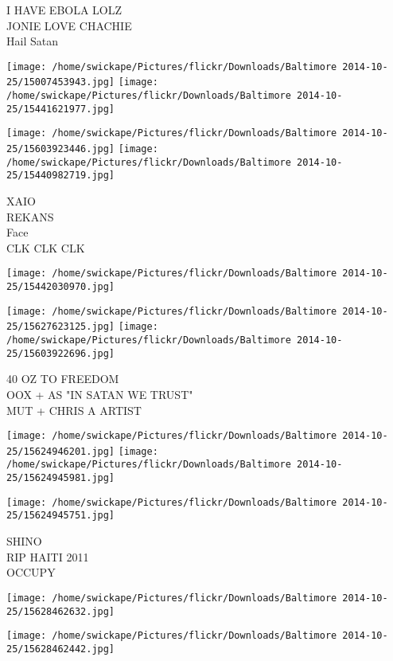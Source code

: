 \documentclass[10pt,letterpaper]{article}
\begin{document}
I HAVE EBOLA LOLZ\\
JONIE LOVE CHACHIE\\
Hail Satan
\pagebreak

\texttt{[image: /home/swickape/Pictures/flickr/Downloads/Baltimore 2014-10-25/15007453943.jpg]}
\texttt{[image: /home/swickape/Pictures/flickr/Downloads/Baltimore 2014-10-25/15441621977.jpg]}

\texttt{[image: /home/swickape/Pictures/flickr/Downloads/Baltimore 2014-10-25/15603923446.jpg]}
\texttt{[image: /home/swickape/Pictures/flickr/Downloads/Baltimore 2014-10-25/15440982719.jpg]}

XAIO\\
REKANS\\
Face\\
CLK CLK CLK
\pagebreak

\texttt{[image: /home/swickape/Pictures/flickr/Downloads/Baltimore 2014-10-25/15442030970.jpg]}

\vspace{0.25in}
\texttt{[image: /home/swickape/Pictures/flickr/Downloads/Baltimore 2014-10-25/15627623125.jpg]}
\texttt{[image: /home/swickape/Pictures/flickr/Downloads/Baltimore 2014-10-25/15603922696.jpg]}

40 OZ TO FREEDOM\\
OOX + AS "IN SATAN WE TRUST"\\
MUT + CHRIS A ARTIST
\pagebreak

\texttt{[image: /home/swickape/Pictures/flickr/Downloads/Baltimore 2014-10-25/15624946201.jpg]}
\texttt{[image: /home/swickape/Pictures/flickr/Downloads/Baltimore 2014-10-25/15624945981.jpg]}

\vspace{0.25in}
\texttt{[image: /home/swickape/Pictures/flickr/Downloads/Baltimore 2014-10-25/15624945751.jpg]}

SHINO\\
RIP HAITI 2011\\
OCCUPY
\pagebreak

\texttt{[image: /home/swickape/Pictures/flickr/Downloads/Baltimore 2014-10-25/15628462632.jpg]}

\vspace{0.25in}
\texttt{[image: /home/swickape/Pictures/flickr/Downloads/Baltimore 2014-10-25/15628462442.jpg]}
\end{document}
